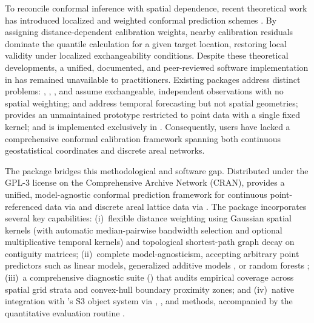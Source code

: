 \documentclass[article]{jss}
\begin{document}
To reconcile conformal inference with spatial dependence, recent theoretical work has introduced localized and weighted conformal prediction schemes \citep{Tibshirani+al:2019, Mao+Martin+Reich:2020}. By assigning distance-dependent calibration weights, nearby calibration residuals dominate the quantile calculation for a given target location, restoring local validity under localized exchangeability conditions. Despite these theoretical developments, a unified, documented, and peer-reviewed software implementation in  has remained unavailable to practitioners. Existing  packages address distinct problems:  \citep{Tibshirani+al:2019}, , , and  assume exchangeable, independent observations with no spatial weighting;  \citep{Wang+Hyndman:2024} and  \citep{Susmann+al:2023} address temporal forecasting but not spatial geometries;  \citep{Mao:GitHub} provides an unmaintained prototype restricted to point data with a single fixed kernel; and  \citep{Lou+Luo+Meng:2025} is implemented exclusively in . Consequently,  users have lacked a comprehensive conformal calibration framework spanning both continuous geostatistical coordinates and discrete areal networks.

The  package bridges this methodological and software gap. Distributed under the GPL-3 license on the Comprehensive  Archive Network (CRAN),  provides a unified, model-agnostic conformal prediction framework for continuous point-referenced data via  and discrete areal lattice data via . The package incorporates several key capabilities: (i)~flexible distance weighting using Gaussian spatial kernels (with automatic median-pairwise bandwidth selection and optional multiplicative temporal kernels) and topological shortest-path graph decay on contiguity matrices; (ii)~complete model-agnosticism, accepting arbitrary point predictors such as linear models, generalized additive models \citep{Wood:2017}, or random forests \citep{Wright+Ziegler:2017}; (iii)~a comprehensive diagnostic suite () that audits empirical coverage across spatial grid strata and convex-hull boundary proximity zones; and (iv)~native integration with 's S3 object system via , , and  methods, accompanied by the quantitative evaluation routine .
\end{document}
